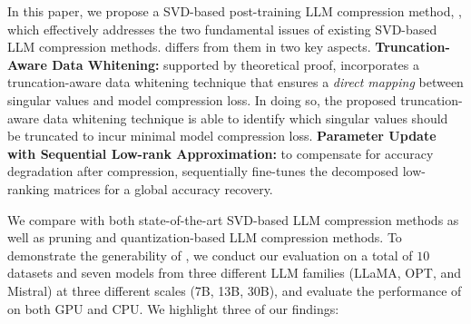 In this paper, we propose a SVD-based post-training LLM compression method, \sysname, which effectively addresses the two fundamental issues of existing SVD-based LLM compression methods.
%
\sysname differs from them in two key aspects.
%
 \textbf{Truncation-Aware Data Whitening:}
supported by theoretical proof, \sysname incorporates a truncation-aware data whitening technique that ensures a \textit{direct mapping} between singular values and model compression loss. In doing so, the proposed truncation-aware data whitening technique is able to identify which singular values should be truncated to incur minimal model compression loss. 
%
 \textbf{Parameter Update with Sequential Low-rank Approximation:}
to compensate for accuracy degradation after compression, \sysname sequentially fine-tunes the decomposed low-ranking matrices for a global accuracy recovery.

We compare \sysname with both state-of-the-art SVD-based LLM compression methods as well as pruning and quantization-based LLM compression methods. To demonstrate the generability of \sysname, we conduct our evaluation on a total of $10$ datasets and seven models from three different LLM families (LLaMA, OPT, and Mistral) at three different scales (7B, 13B, 30B), and evaluate the performance of \sysname on both GPU and CPU. We highlight three of our findings:

